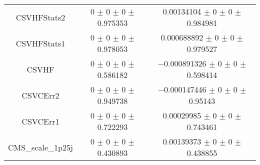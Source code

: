 \begin{table}
\begin{tabular}{ccc}
CSVHFStats2 & \num{0} $\pm$ \num{0} $\pm$ \num{0} $\pm$ \num{0.975353} & \num{0.00134104} $\pm$ \num{0} $\pm$ \num{0} $\pm$ \num{0.984981}\\
CSVHFStats1 & \num{0} $\pm$ \num{0} $\pm$ \num{0} $\pm$ \num{0.978053} & \num{0.000688892} $\pm$ \num{0} $\pm$ \num{0} $\pm$ \num{0.979527}\\
CSVHF & \num{0} $\pm$ \num{0} $\pm$ \num{0} $\pm$ \num{0.586182} & \num{-0.000891326} $\pm$ \num{0} $\pm$ \num{0} $\pm$ \num{0.598414}\\
CSVCErr2 & \num{0} $\pm$ \num{0} $\pm$ \num{0} $\pm$ \num{0.949738} & \num{-0.000147446} $\pm$ \num{0} $\pm$ \num{0} $\pm$ \num{0.95143}\\
CSVCErr1 & \num{0} $\pm$ \num{0} $\pm$ \num{0} $\pm$ \num{0.722293} & \num{0.00029985} $\pm$ \num{0} $\pm$ \num{0} $\pm$ \num{0.743461}\\
CMS\_scale\_1p25j & \num{0} $\pm$ \num{0} $\pm$ \num{0} $\pm$ \num{0.430893} & \num{0.00139373} $\pm$ \num{0} $\pm$ \num{0} $\pm$ \num{0.438855}\\
\bottomrule
\end{tabular}
\end{table}